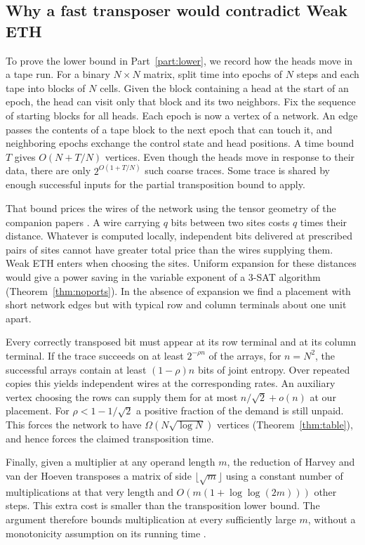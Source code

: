 \subsection{Why a fast transposer would contradict Weak ETH}

To prove the lower bound in Part~\ref{part:lower}, we record how the
heads move in a tape run. For a binary $N\times N$ matrix, split time into
epochs of $N$ steps and each tape into blocks of $N$ cells. Given the
block containing a head at the start of an epoch, the head can visit
only that block and its two neighbors. Fix the sequence of starting
blocks for all heads. Each epoch is now a vertex of a network. An
edge passes the contents of a tape block to the next epoch that can
touch it, and neighboring epochs exchange the control state and head
positions. A time bound $T$ gives $O(N+T/N)$ vertices. Even though
the heads move in response to their data, there are only
$2^{O(1+T/N)}$ such coarse traces. Some trace is shared by enough
successful inputs for the partial transposition bound to apply.

That bound prices the wires of the network using the tensor geometry
of the companion papers \cite{oaG,oaP}. A wire carrying $q$ bits
between two sites costs $q$ times their distance. Whatever is
computed locally, independent bits delivered at prescribed pairs of
sites cannot have greater total price than the wires supplying them.
Weak ETH enters when choosing the sites. Uniform expansion for these
distances would give a power saving in the variable exponent of a
3-SAT algorithm (Theorem~\ref{thm:noports}). In the absence of
expansion we find a placement with short network edges but with
typical row and column terminals about one unit apart.

Every correctly transposed bit must appear at its row terminal and
at its column terminal. If the trace succeeds on at least
$2^{-\rho n}$ of the arrays, for $n=N^2$, the successful arrays
contain at least $(1-\rho)n$ bits of joint entropy. Over repeated
copies this yields independent wires at the corresponding rates.
An auxiliary vertex choosing the rows can supply them for at most
$n/\sqrt2+o(n)$ at our placement. For $\rho<1-1/\sqrt2$ a positive
fraction of the demand is still unpaid. This forces the network to
have $\Omega(N\sqrt{\log N})$ vertices (Theorem~\ref{thm:table}),
and hence forces the claimed transposition time.

Finally, given a multiplier at any operand length $m$, the reduction
of Harvey and van der Hoeven transposes a matrix of side
$\lfloor\sqrt m\rfloor$ using a constant number of multiplications at
that very length and $O(m(1+\log\log(2m)))$ other steps. This extra
cost is smaller than the transposition lower bound. The argument
therefore bounds multiplication at every sufficiently large $m$,
without a monotonicity assumption on its running time
\cite[full version, Corollaries~6.2 and~6.3]{hvhtranspose}.
